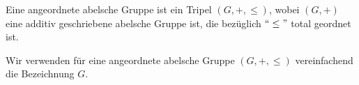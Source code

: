 
%
\begin{defn} %
Eine angeordnete abelsche Gruppe ist ein Tripel $\left(G, +, \leq\right)$, wobei $\left(G, +\right)$ eine additiv geschriebene abelsche Gruppe ist, die bezüglich $``\leq "$ total geordnet ist.
\end{defn}
%
%
%
%
\begin{nota}
Wir verwenden 
 für eine angeordnete abelsche Gruppe $\left(G, +, \leq\right)$ vereinfachend die Bezeichnung $G$.
\end{nota}

